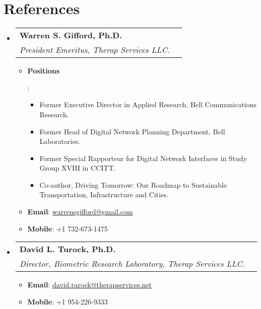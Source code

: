 \documentclass[letterpaper,11pt]{article}
\makeatletter
\newcommand{\resumeItem}[2]{
  \item\small{
    \textbf{#1}{: #2 \vspace{-2pt}}
  }
}
\newcommand{\resumeSubheading}[4]{
  \vspace{-1pt}\item
    \begin{tabular*}{0.97\textwidth}[t]{l@{\extracolsep{\fill}}r}
      \textbf{#1} & #2 \\
      \textit{\small#3} & \textit{\small #4} \\
    \end{tabular*}\vspace{-5pt}
}
\newcommand{\resumeSubHeadingListStart}{\begin{itemize}[leftmargin=*]}
\newcommand{\resumeSubHeadingListEnd}{\end{itemize}}
\newcommand{\resumeItemListStart}{\begin{itemize}}
\newcommand{\resumeItemListEnd}{\end{itemize}\vspace{-5pt}}
\makeatother
\begin{document}
\section{References}
  \resumeSubHeadingListStart
       \resumeSubheading
      {Warren S. Gifford, Ph.D.}{}
      {President Emeritus, Therap Services LLC.}{}
      \resumeItemListStart
      	\resumeItem{Positions}{
			\begin{itemize}
				\item Former Executive Director in Applied Research, Bell Communications Research.
				\item Former Head of Digital Network Planning Department, Bell Laboratories.
				\item Former Special Rapporteur for Digital Network Interfaces in Study Group XVIII in CCITT.
				\item Co-author, Driving Tomorrow: Our Roadmap to Sustainable Transportation, Infrastructure and Cities.
			\end{itemize}			      	
      	}
      	\resumeItem{Email}{ \href{mailto:warrensgifford@gmail.com}{warrensgifford@gmail.com}}
      	\resumeItem{Mobile}{+1 732-673-1475}
      \resumeItemListEnd    
      
     \resumeSubheading
      {David L. Turock, Ph.D.}{}
      {Director, Biometric Research Laboratory, Therap Services LLC.}{}
      \resumeItemListStart
      	\resumeItem{Email}{ \href{mailto:david.turock@therapservices.net}{david.turock@therapservices.net}}
      	\resumeItem{Mobile}{+1 954-226-9333}
      \resumeItemListEnd
 \resumeSubHeadingListEnd
\end{document}
